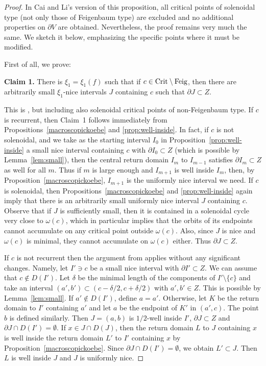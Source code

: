 \documentclass[12pt, psamsfonts, reqno]{amsart}
\begin{document}
\begin{proof}
 In Cai and Li's version of this proposition, all critical points
 of solenoidal type (not only those of Feigenbaum type) are excluded and no additional
 properties on $\partial V$ are obtained.
 Nevertheless, the proof remains very much the same. We sketch it
 below, emphasizing the specific points where it must be modified.

 First of all, we prove:

 \textbf{Claim 1.} There is $\xi_1=\xi_1(f)$ such that if $c\in
 {\mathop{\rm Crit}\nolimits}\setminus {\mathop{\rm Feig}\nolimits}$, then there are arbitrarily small
 $\xi_1$-nice intervals $J$ containing $c$ such that $\partial
 J\subset Z$.

 This is \cite[Corollary~3]{caili}, but including also solenoidal
 critical points of non-Feigenbaum type. If $c$ is recurrent, then Claim~1 follows
 immediately from Propositions~\ref{macroscopickoebe} and
 \ref{prop:well-inside}. In fact, if $c$ is not solenoidal, and we
 take as the starting interval $I_0$ in
 Proposition~\ref{prop:well-inside} a small nice interval containing
$c$ with $\partial I_0\subset Z$ (which is possible by
 Lemma~\ref{lem:small}), then the central
return domain $I_m$ to $I_{m-1}$ satisfies $\partial I_m\subset Z$ as well
 for all $m$. Thus if $m$ is large enough
 and $I_{m+1}$ is well inside $I_m$, then,
 by Proposition~\ref{macroscopickoebe}, $I_{m+1}$ is the
 uniformly nice interval we need. If $c$ is solenoidal, then
 Propositions~\ref{macroscopickoebe} and
 \ref{prop:well-inside} again imply that there is an arbitrarily small
 uniformly nice interval $J$ containing $c$. Observe that
 if $J$ is sufficiently small, then it is contained in a solenoidal
 cycle very close to $\omega(c)$, which in particular implies that
 the orbits of its endpoints cannot accumulate on any critical
 point outside $\omega(c)$. Also, since $J$ is nice and $\omega(c)$ is minimal,
 they cannot accumulate on $\omega(c)$ either. Thus $\partial
 J\subset Z$.

If $c$ is not recurrent then
the argument from \cite[Corollary~3]{caili} applies without
 any significant changes. Namely, let $I'\owns c$ be a small nice interval
 with $\partial I'\subset Z$. We can assume that $c\notin D(I')$.
 Let $\delta$ be the minimal length
 of the components of $I'\setminus \{c\}$ and take an interval
 $(a',b')\subset (c-\delta/2,c+\delta/2)$ with $a',b'\in Z$.
This is possible by Lemma~\ref{lem:small}. If $a'\notin
 D(I')$, define $a=a'$. Otherwise, let $K$ be the return domain to
 $I'$ containing $a'$ and let $a$ be the endpoint of $K'$ in
 $(a',c)$. The point $b$ is defined similarly. Then $J=(a,b)$ is
 $1/2$-well inside $I'$, $\partial J\subset Z$ and $\partial J\cap
 D(I')=\emptyset$. If $x\in J\cap D(J)$, then the return domain $L$ to
 $J$ containing $x$ is well inside the return domain $L'$
to $I'$
 containing $x$ by  Proposition~\ref{macroscopickoebe}.
 Since $\partial J\cap D(I')=\emptyset$, we obtain
 $L' \subset J$. Then $L$ is well inside $J$ and $J$ is uniformly
 nice.


\end{proof}
\end{document}
